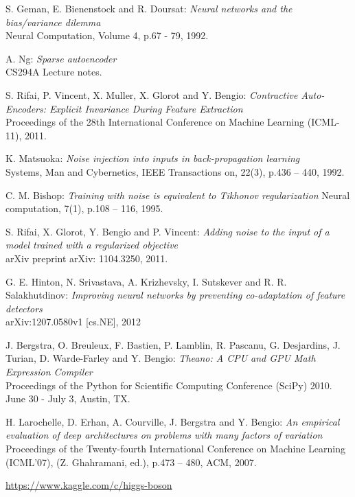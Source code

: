 \documentclass[a4paper,11pt]{report}
\begin{document}
\begin{thebibliography}{99}
	 S. Geman, E. Bienenstock and R. Doursat: {\em Neural networks and the bias/variance dilemma}\\
	Neural Computation, Volume 4, p.67 - 79, 1992.
	
	 A. Ng: {\em Sparse autoencoder}\\
	CS294A Lecture notes.
	
	 S. Rifai, P. Vincent, X. Muller, X. Glorot and Y. Bengio: {\em Contractive Auto-Encoders: Explicit Invariance During Feature Extraction}\\
	Proceedings of the 28th International Conference on Machine Learning (ICML-11), 2011.

	 K. Matsuoka: {\em Noise injection into inputs in back-propagation learning}\\
	Systems, Man and Cybernetics, IEEE Transactions on, 22(3), p.436 – 440, 1992.
	
	 C. M. Bishop: {\em Training with noise is equivalent to Tikhonov regularization}
	Neural computation, 7(1), p.108 – 116, 1995.
	
	 S. Rifai, X. Glorot, Y. Bengio and P. Vincent: {\em Adding noise to the input of a model trained with a regularized objective}\\
	arXiv preprint arXiv: 1104.3250, 2011.
	
	 G. E. Hinton, N. Srivastava, A. Krizhevsky, I. Sutskever and R. R. Salakhutdinov: {\em Improving neural networks by preventing co-adaptation of feature detectors}\\
	arXiv:1207.0580v1 [cs.NE], 2012
	
	 J. Bergstra, O. Breuleux, F. Bastien, P. Lamblin, R. Pascanu, G. Desjardins, J. Turian, D. Warde-Farley and Y. Bengio: {\em Theano: A CPU and GPU Math Expression Compiler}\\
	Proceedings of the Python for Scientific Computing Conference (SciPy) 2010. June 30 - July 3, Austin, TX.
	
	 H. Larochelle, D. Erhan, A. Courville, J. Bergstra and Y. Bengio: {\em An empirical evaluation of deep architectures on problems with many factors of variation}\\
	Proceedings of the Twenty-fourth International Conference on Machine Learning (ICML’07), (Z. Ghahramani, ed.), p.473 – 480, ACM, 2007.
	
	 \url{https://www.kaggle.com/c/higgs-boson}
	

\end{thebibliography}
\end{document}
